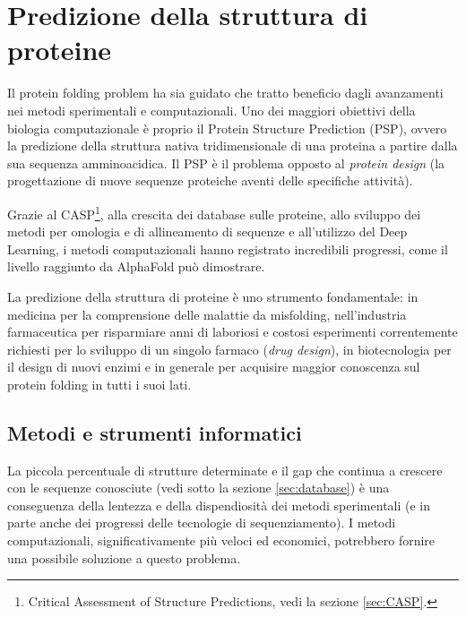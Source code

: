 \chapter{Predizione della struttura di proteine}

Il protein folding problem ha sia guidato che tratto beneficio dagli avanzamenti nei metodi sperimentali e computazionali\supercite{dill2008protein}. Uno dei maggiori obiettivi della biologia computazionale è proprio il Protein Structure Prediction (PSP), ovvero la predizione della struttura nativa tridimensionale di una proteina a partire dalla sua sequenza amminoacidica. Il PSP è il problema opposto al \textit{protein design} (la progettazione di nuove sequenze proteiche aventi delle specifiche attività).

\par Grazie al CASP\footnote{Critical Assessment of Structure Predictions, vedi la sezione \ref{sec:CASP}.}, alla crescita dei database sulle proteine, allo sviluppo dei metodi per omologia e di allineamento di sequenze e all'utilizzo del Deep Learning, i metodi computazionali hanno registrato incredibili progressi, come il livello raggiunto da AlphaFold può dimostrare. 

\par La predizione della struttura di proteine è uno strumento fondamentale: in medicina per la comprensione delle malattie da misfolding, nell'industria farmaceutica per risparmiare anni di laboriosi e costosi esperimenti correntemente richiesti per lo sviluppo di un singolo farmaco (\textit{drug design}), in biotecnologia per il design di nuovi enzimi e in generale per acquisire maggior conoscenza sul protein folding in tutti i suoi lati.

\section{Metodi e strumenti informatici}

La piccola percentuale di strutture determinate e il gap che continua a crescere con le sequenze conosciute (vedi sotto la sezione \ref{sec:database}) è una conseguenza della lentezza e della dispendiosità dei metodi sperimentali (e in parte anche dei progressi delle tecnologie di sequenziamento). I metodi computazionali, significativamente più veloci ed economici, potrebbero fornire una possibile soluzione a questo problema.

